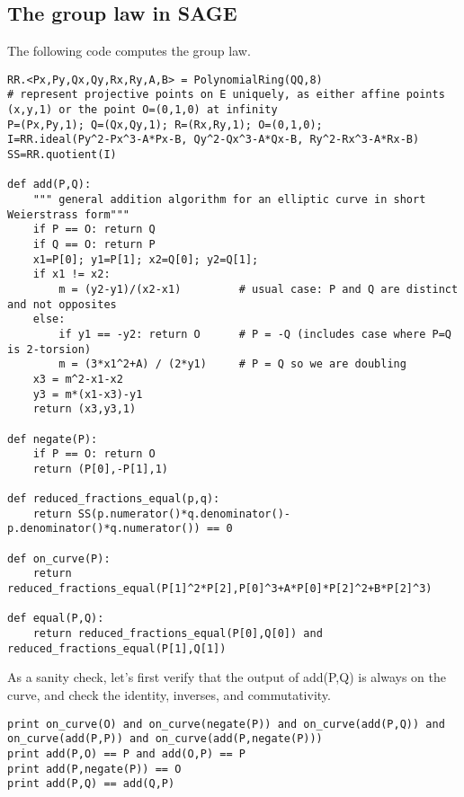 \subsection{The group law in SAGE}
The following code computes the group law. %
\begin{lstlisting}
RR.<Px,Py,Qx,Qy,Rx,Ry,A,B> = PolynomialRing(QQ,8)
# represent projective points on E uniquely, as either affine points (x,y,1) or the point O=(0,1,0) at infinity
P=(Px,Py,1); Q=(Qx,Qy,1); R=(Rx,Ry,1); O=(0,1,0);
I=RR.ideal(Py^2-Px^3-A*Px-B, Qy^2-Qx^3-A*Qx-B, Ry^2-Rx^3-A*Rx-B)
SS=RR.quotient(I)

def add(P,Q):
    """ general addition algorithm for an elliptic curve in short Weierstrass form"""
    if P == O: return Q
    if Q == O: return P
    x1=P[0]; y1=P[1]; x2=Q[0]; y2=Q[1];
    if x1 != x2:
        m = (y2-y1)/(x2-x1)         # usual case: P and Q are distinct and not opposites
    else:
        if y1 == -y2: return O      # P = -Q (includes case where P=Q is 2-torsion)
        m = (3*x1^2+A) / (2*y1)     # P = Q so we are doubling
    x3 = m^2-x1-x2
    y3 = m*(x1-x3)-y1
    return (x3,y3,1)

def negate(P):
    if P == O: return O
    return (P[0],-P[1],1)
    
def reduced_fractions_equal(p,q):
    return SS(p.numerator()*q.denominator()-p.denominator()*q.numerator()) == 0
    
def on_curve(P):
    return reduced_fractions_equal(P[1]^2*P[2],P[0]^3+A*P[0]*P[2]^2+B*P[2]^3)
    
def equal(P,Q):
    return reduced_fractions_equal(P[0],Q[0]) and reduced_fractions_equal(P[1],Q[1]) 
\end{lstlisting}
As a sanity check, let's first verify that the output of add(P,Q) is always on the curve, and check the identity, inverses, and commutativity.
\begin{lstlisting}
print on_curve(O) and on_curve(negate(P)) and on_curve(add(P,Q)) and on_curve(add(P,P)) and on_curve(add(P,negate(P)))
print add(P,O) == P and add(O,P) == P
print add(P,negate(P)) == O
print add(P,Q) == add(Q,P) 
\end{lstlisting}

